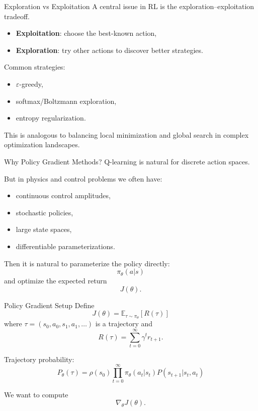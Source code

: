 \documentclass[aspectratio=169]{beamer}
\begin{document}
\begin{frame}{Exploration vs Exploitation}
  A central issue in RL is the exploration--exploitation tradeoff.

  \begin{itemize}
  \item \textbf{Exploitation}: choose the best-known action,
  \item \textbf{Exploration}: try other actions to discover better strategies.
  \end{itemize}

  Common strategies:
  \begin{itemize}
  \item $\varepsilon$-greedy,
  \item softmax/Boltzmann exploration,
  \item entropy regularization.
  \end{itemize}

  This is analogous to balancing local minimization and global search in complex optimization landscapes.
\end{frame}

\begin{frame}{Why Policy Gradient Methods?}
  Q-learning is natural for discrete action spaces.

  But in physics and control problems we often have:
  \begin{itemize}
  \item continuous control amplitudes,
  \item stochastic policies,
  \item large state spaces,
  \item differentiable parameterizations.
  \end{itemize}

  Then it is natural to parameterize the policy directly:
  \[
  \pi_\theta(a|s)
  \]
  and optimize the expected return
  \[
  J(\theta).
  \]
\end{frame}

\begin{frame}{Policy Gradient Setup}
  Define
  \[
  J(\theta)=\mathbb{E}_{\tau\sim \pi_\theta}[R(\tau)]
  \]
  where $\tau=(s_0,a_0,s_1,a_1,\dots)$ is a trajectory and
  \[
  R(\tau)=\sum_{t=0}^\infty \gamma^t r_{t+1}.
  \]

  Trajectory probability:
  \[
  P_\theta(\tau)=\rho(s_0)\prod_{t=0}^\infty \pi_\theta(a_t|s_t)P(s_{t+1}|s_t,a_t)
  \]

  We want to compute
  \[
  \nabla_\theta J(\theta).
  \]
\end{frame}
\end{document}
